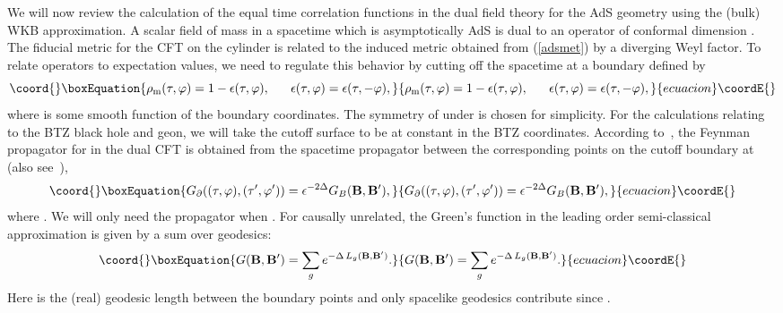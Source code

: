 \documentclass[a4paper,12pt]{article}
\def\calo{{\cal O}}
\begin{document}
We will now review the calculation of the equal time correlation
functions in the dual field theory for the AdS\coordHE{} geometry using the
(bulk) WKB approximation. A scalar field of mass \coordHE{} in a spacetime
which is asymptotically AdS\coordHE{} is dual to an operator \myHighlight{$\calo$}\coordHE{} of
conformal dimension \coordHE{}. The fiducial metric
for the CFT on the cylinder is related to the induced metric obtained
from (\ref{adsmet}) by a diverging Weyl factor.  To relate operators
to expectation values, we need to regulate this behavior by cutting
off the spacetime at a boundary defined by
\begin{equation}\coord{}\boxEquation{ 
\rho_{{\rm m}}(\tau,\varphi) = 1 - \epsilon(\tau,\varphi),~~~~~
\epsilon(\tau,\varphi) = \epsilon(\tau,-\varphi),
\label{regulate} 
}{ 
\rho_{{\rm m}}(\tau,\varphi) = 1 - \epsilon(\tau,\varphi),~~~~~
\epsilon(\tau,\varphi) = \epsilon(\tau,-\varphi),
}{ecuacion}\coordE{}\end{equation} 
where \myHighlight{$\epsilon$}\coordHE{} is some smooth function of the boundary coordinates.
The symmetry of \myHighlight{$\epsilon$}\coordHE{} under \myHighlight{$\varphi \rightarrow -\varphi$}\coordHE{} is
chosen for simplicity. For the calculations relating to the BTZ black
hole and geon, we will take the cutoff surface to be at constant \coordHE{}
in the BTZ coordinates. According to~\cite{bdhm}, the Feynman
propagator for \myHighlight{$\calo$}\coordHE{} in the dual CFT is obtained from the spacetime
propagator between the corresponding points on the cutoff boundary at
\coordHE{} (also see~\cite{witten,gkp}),
%
\begin{equation}\coord{}\boxEquation{ \label{prop}
G_\partial((\tau,\varphi),(\tau',\varphi')) = \epsilon^{-2 \Delta}
G_B({\bf B},{\bf B'}),
}{ G_\partial((\tau,\varphi),(\tau',\varphi')) = \epsilon^{-2 \Delta}
G_B({\bf B},{\bf B'}),
}{ecuacion}\coordE{}\end{equation}
where \coordHE{}. We will
only need the propagator when \coordHE{}.  For \coordHE{} causally
unrelated, the Green's function \coordHE{} in the leading order
semi-classical approximation is given by a sum over geodesics:
\begin{equation}\coord{}\boxEquation{ 
G({\bf B},{\bf B}') = \sum_g e^{-\Delta \, L_g({\bf B},{\bf B}')}.
\label{sum1} 
}{ 
G({\bf B},{\bf B}') = \sum_g e^{-\Delta \, L_g({\bf B},{\bf B}')}.
}{ecuacion}\coordE{}\end{equation} 
Here \coordHE{} is the (real) geodesic length between the boundary 
points and only spacelike geodesics contribute since 
\coordHE{}.
 
\end{document}

